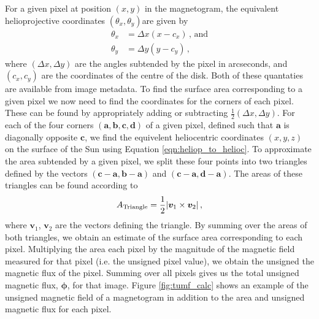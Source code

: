 \documentclass[11pt,a4paper,onecolumn]{report}
\DeclarePairedDelimiter{\abs}{\lvert}{\rvert}
\begin{document}
For a given pixel at position \( (x, y) \) in the magnetogram, the equivalent
helioprojective coordinates \((\theta_x, \theta_y)\)are given by
\begin{align}
  \theta_x &= \Delta x (x - c_x) \, \text{, and} \\
  \theta_y &= \Delta y (y - c_y) \, ,
\end{align}
where  \((\Delta x, \Delta y)\) are the angles subtended by the pixel in
arcseconds, and \( (c_x, c_y) \) are the coordinates of the centre of the disk.
Both of these quantaties are available from image metadata. To find the surface
area corresponding to a given pixel we now need to find the coordinates for the
corners of each pixel. These can be found by appropriately adding or subtracting
\(\frac{1}{2} (\Delta x, \Delta y)\). For each of the four corners \((\bm{a},
\bm{b}, \bm{c}, \bm{d})\) of a given pixel, defined such that $\bm{a}$ is
diagonally opposite $\bm{c}$, we find the equivelent heliocentric coordinates
\((x, y, z)\) on the surface of the Sun using Equation
\ref{eqn:heliop_to_helioc}. To approximate the area subtended by a given pixel,
we split these four points into two triangles defined by the vectors
\((\bm{c}-\bm{a}, \bm{b} - \bm{a}) \) and \((\bm{c}-\bm{a}, \bm{d} - \bm{a}) \).
The areas of these triangles can be found according to
\begin{align}
  A_{\text{Triangle}} = \frac{1}{2} \abs*{\bm{v}_1 \times \bm{v}_2} \, ,
\end{align}
where \(\bm{v}_1\), \(\bm{v}_2\) are the vectors defining the triangle. By
summing over the areas of both triangles, we obtain an estimate of the surface
area corresponding to each pixel. Multiplying the area each pixel by the
magnitude of the magnetic field measured for that pixel (i.e. the unsigned pixel
value), we obtain the unsigned the magnetic flux of the pixel. Summing over all
pixels gives us the total unsigned magnetic flux, \(\bm{\phi}\), for that image.
Figure \ref{fig:tumf_calc} shows an example of the unsigned magnetic field of a
magnetogram in addition to the area and unsigned magnetic flux for each pixel.
\end{document}
